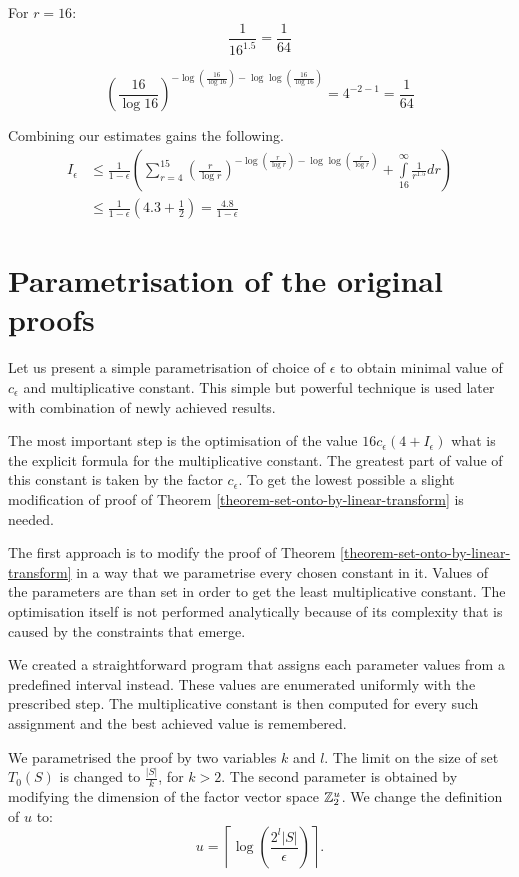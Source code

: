 For $r = 16$:
\[
	\frac{1}{16 ^ {1.5}} = \frac{1}{64}
\]

\[
	\left(\frac{16}{\log 16}\right)^{-\log \left(\frac{16}{\log 16}\right) - \log \log \left(\frac{16}{\log 16}\right)} = 4^{-2 - 1} = \frac{1}{64}
\]

Combining our estimates gains the following.
\[
\begin{split}
I_{\epsilon} 
	& \leq \frac{1}{1 - \epsilon} \left( \displaystyle \sum_{r = 4}^{15} \left(\frac{r}{\log r}\right)^{-\log \left(\frac{r}{\log r}\right) - \log \log \left(\frac{r}{\log r}\right)} + \int\limits_{16}^\infty \frac{1}{r^{1.5}} dr \right) \\
	& \leq \frac{1}{1 - \epsilon} \left(4.3 + \frac{1}{2}\right) = \frac{4.8}{1-\epsilon}
\end{split}
\]

\section{Parametrisation of the original proofs}
Let us present a simple parametrisation of choice of $\epsilon$ to obtain minimal value of $c_\epsilon$ and multiplicative constant. This simple but powerful technique is used later with combination of newly achieved results.

The most important step is the optimisation of the value $16 c_\epsilon (4 + I_{\epsilon})$ what is the explicit formula for the multiplicative constant. The greatest part of value of this constant is taken by the factor $c_\epsilon$. To get the lowest possible a slight modification of proof of Theorem \ref{theorem-set-onto-by-linear-transform} is needed.

The first approach is to modify the proof of Theorem \ref{theorem-set-onto-by-linear-transform} in a way that we parametrise every chosen constant in it. Values of the parameters are than set in order to get the least multiplicative constant. The optimisation itself is not performed analytically because of its complexity that is caused by the constraints that emerge. 

We created a straightforward program that assigns each parameter values from a predefined interval instead. These values are enumerated uniformly with the prescribed step. The multiplicative constant is then computed for every such assignment and the best achieved value is remembered.

We parametrised the proof by two variables $k$ and $l$. The limit on the size of set $T_0(S)$ is changed to $\frac{|S|}{k}$, for $k > 2$. The second parameter is obtained by modifying the dimension of the factor vector space $\mathbb{Z}_{2}^{u}$. We change the definition of $u$ to:
\[
u = \left\lceil \log \left(\frac{2^l |S|}{\epsilon}\right) \right\rceil \text{.}
\]


